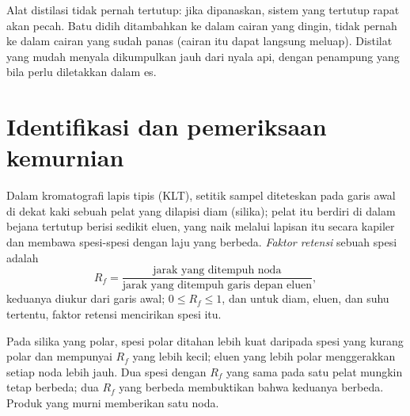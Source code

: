 \begin{safety}{}
Alat distilasi tidak pernah tertutup: jika dipanaskan, sistem yang
tertutup rapat akan pecah. Batu didih ditambahkan ke dalam cairan yang
dingin, tidak pernah ke dalam cairan yang sudah panas (cairan itu dapat
langsung meluap). Distilat yang mudah menyala dikumpulkan jauh dari nyala
api, dengan penampung yang bila perlu diletakkan dalam es.
\end{safety}

\section{Identifikasi dan pemeriksaan kemurnian}

\begin{definition}\label{def:b1:lab-techniques-1:retention-factor}
Dalam kromatografi lapis tipis (KLT), setitik sampel diteteskan pada
garis awal di dekat kaki sebuah pelat yang dilapisi  diam (silika);
pelat itu berdiri di dalam bejana tertutup berisi sedikit eluen, yang
naik melalui lapisan itu secara kapiler dan membawa spesi-spesi dengan
laju yang berbeda. \emph{Faktor retensi} sebuah
spesi adalah
\[
  R_f = \frac{\text{jarak yang ditempuh noda}}
             {\text{jarak yang ditempuh garis depan eluen}},
\]
keduanya diukur dari garis awal; $0 \le R_f \le 1$, dan untuk  diam,
eluen, dan suhu tertentu, faktor retensi mencirikan spesi itu.
\end{definition}

Pada silika yang polar, spesi polar ditahan lebih kuat daripada spesi
yang kurang polar dan mempunyai $R_f$ yang lebih kecil; eluen yang lebih
polar menggerakkan setiap noda lebih jauh. Dua spesi dengan $R_f$ yang
sama pada satu pelat mungkin tetap berbeda; dua $R_f$ yang berbeda
membuktikan bahwa keduanya berbeda. Produk yang murni memberikan satu
noda.

